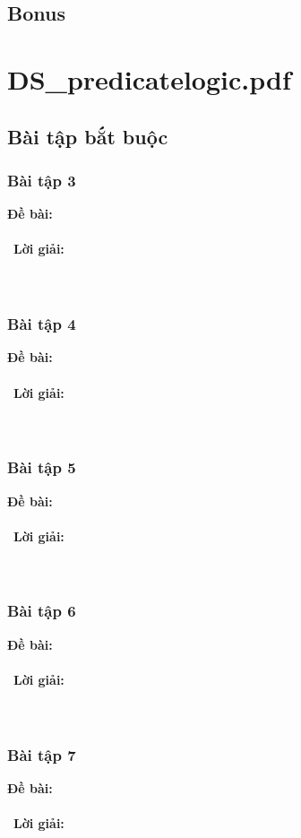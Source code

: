 \documentclass[a4paper]{article}
\begin{document}
\subsection{Bonus}

\clearpage

\section{DS\_predicatelogic.pdf}
\subsection{Bài tập bắt buộc}
\subsubsection{Bài tập 3}
\textbf{Đề bài:} 
\\\ \\\
\textbf{Lời giải:} \\\ \\\
\clearpage
\subsubsection{Bài tập 4}
\textbf{Đề bài:} 
\\\ \\\
\textbf{Lời giải:} \\\ \\\
\clearpage
\subsubsection{Bài tập 5}
\textbf{Đề bài:} 
\\\ \\\
\textbf{Lời giải:} \\\ \\\
\clearpage
\subsubsection{Bài tập 6}
\textbf{Đề bài:} 
\\\ \\\
\textbf{Lời giải:} \\\ \\\
\clearpage
\subsubsection{Bài tập 7}
\textbf{Đề bài:} 
\\\ \\\
\textbf{Lời giải:} \\\ \\\
\clearpage
\end{document}
